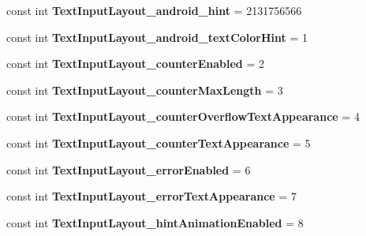 \begin{DoxyCompactItemize}
const int {\bfseries Text\+Input\+Layout\+\_\+android\+\_\+hint} = 2131756566
\item 
\mbox{\label{classst_delivery_1_1_resource_1_1_styleable_a7e6ff8dd14823abd35be224d40108cc2}} 
const int {\bfseries Text\+Input\+Layout\+\_\+android\+\_\+text\+Color\+Hint} = 1
\item 
\mbox{\label{classst_delivery_1_1_resource_1_1_styleable_aa248a6944cd6b484cf99924ac4228ba3}} 
const int {\bfseries Text\+Input\+Layout\+\_\+counter\+Enabled} = 2
\item 
\mbox{\label{classst_delivery_1_1_resource_1_1_styleable_a1702d5a78f808506ee2a7b8bd3fd35b1}} 
const int {\bfseries Text\+Input\+Layout\+\_\+counter\+Max\+Length} = 3
\item 
\mbox{\label{classst_delivery_1_1_resource_1_1_styleable_af695a444884f7a22280fd31389f43374}} 
const int {\bfseries Text\+Input\+Layout\+\_\+counter\+Overflow\+Text\+Appearance} = 4
\item 
\mbox{\label{classst_delivery_1_1_resource_1_1_styleable_ac5e13fcff3502035d620859355bd5700}} 
const int {\bfseries Text\+Input\+Layout\+\_\+counter\+Text\+Appearance} = 5
\item 
\mbox{\label{classst_delivery_1_1_resource_1_1_styleable_a8b92cba6cf1481c6bac670238911d7a4}} 
const int {\bfseries Text\+Input\+Layout\+\_\+error\+Enabled} = 6
\item 
\mbox{\label{classst_delivery_1_1_resource_1_1_styleable_a8985bb388bf4d4d402822b18de32f7d2}} 
const int {\bfseries Text\+Input\+Layout\+\_\+error\+Text\+Appearance} = 7
\item 
\mbox{\label{classst_delivery_1_1_resource_1_1_styleable_a36502d4cde9fb6e50fc9ab68788eae28}} 
const int {\bfseries Text\+Input\+Layout\+\_\+hint\+Animation\+Enabled} = 8
\item 
\mbox{\label{classst_delivery_1_1_resource_1_1_styleable_ad6f227cacee2cb66d43e851545add2ba}} 

\end{DoxyCompactItemize}
